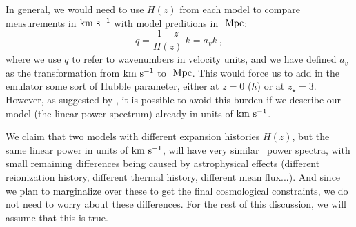 In general, we would need to use $H(z)$ from each model to compare 
measurements in ${\rm km~s^{-1}}$ with model preditions in $\ \text{Mpc}$:
\begin{equation}
 q = \frac{1+z}{H(z)} ~ k = a_v k~,
\end{equation}
where we use $q$ to refer to wavenumbers in velocity units, and we have 
defined $a_v$ as the transformation from ${\rm km~s^{-1}}$ to $\ \text{Mpc}$.
This would force us to add in the emulator some sort of Hubble 
parameter, either at $z=0$ ($h$) or at $z_\star=3$. 
However, as suggested by \cite{McDonald2005a}, it is possible to avoid this
burden if we describe our model (the linear power spectrum) already in 
units of ${\rm km~s^{-1}}$. 


We claim that two models with different expansion histories $H(z)$, but the
same linear power in units of ${\rm km~s^{-1}}$, will have very similar \lya\ power
spectra, with small remaining differences being caused by astrophysical 
effects (different reionization history, different thermal history, different
mean flux...). 
And since we plan to marginalize over these to get the final cosmological 
constraints, we do not need to worry about these differences. 
For the rest of this discussion, we will assume that this is true.

